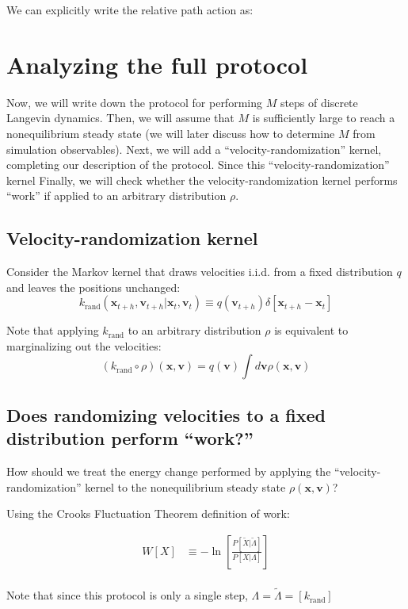 \documentclass[11pt]{article}
\newcommand{\x}{\mathbf{x}}
\newcommand{\vel}{\mathbf{v}}
\begin{document}
We can explicitly write the relative path action as: %

\section{Analyzing the full protocol}
Now, we will write down the protocol for performing $M$ steps of discrete Langevin dynamics.
Then, we will assume that $M$ is sufficiently large to reach a nonequilibrium steady state (we will later discuss how to determine $M$ from simulation observables).
Next, we will add a ``velocity-randomization'' kernel, completing our description of the protocol.
Since this ``velocity-randomization'' kernel 
Finally, we will check whether the velocity-randomization kernel performs ``work'' if applied to an arbitrary distribution $\rho$.

\subsection{Velocity-randomization kernel}
Consider the Markov kernel that draws velocities i.i.d. from a fixed distribution $q$ and leaves the positions unchanged:
$$k_\text{rand} (\x_{t+h}, \vel_{t+h} | \x_{t}, \vel_{t}) \equiv q(\vel_{t+h}) \delta[\x_{t+h} - \x_{t}]$$

Note that applying $k_\text{rand}$ to an arbitrary distribution $\rho$ is equivalent to marginalizing out the velocities:
$$ (k_\text{rand} \circ \rho)(\x, \vel) = q(\vel) \int d \vel \rho(\x, \vel)$$

\subsection{Does randomizing velocities to a fixed distribution perform ``work?''}
How should we treat the energy change performed by applying the ``velocity-randomization'' kernel to the nonequilibrium steady state $\rho(\x, \vel)$?

Using the Crooks Fluctuation Theorem definition of work:

$$\begin{aligned}
W[X] &\equiv -\ln \left[ \frac{P[\tilde{X} | \tilde{\Lambda}]}{P[X | \Lambda]} \right]\\
\end{aligned}$$

Note that since this protocol is only a single step, $\Lambda = \tilde{\Lambda} = [k_\text{rand}]$
\end{document}
